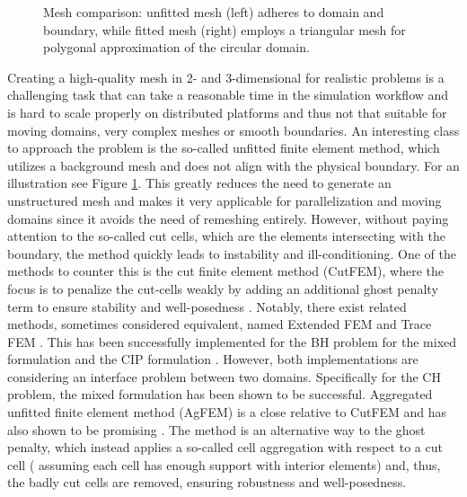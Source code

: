 \begin{figure}[h!]
\begin{minipage}{0.45\textwidth}
    \end{minipage}
\caption{Mesh comparison: unfitted mesh (left) adheres to domain and boundary, while fitted mesh (right) employs a triangular mesh for polygonal approximation of the circular domain.}
\label{fig:domain_mesh}
\end{figure}

Creating a high-quality mesh in 2- and 3-dimensional for realistic problems is a challenging task that can take a reasonable time in the simulation workflow and is hard to scale properly on distributed platforms and thus not that suitable for moving
domains, very complex meshes or smooth boundaries. An interesting class to approach the problem is the so-called unfitted finite element method, which utilizes a background mesh and does not align with the physical boundary. For an illustration
see Figure \ref{fig:domain_mesh}.
This greatly reduces the need to generate an unstructured mesh and makes it very applicable for parallelization and moving domains
since it avoids the need of remeshing entirely. However, without paying attention to the so-called cut cells, which are the elements intersecting with the boundary, the method quickly leads to instability and ill-conditioning.
One of the methods to counter this is the cut finite element method (CutFEM), where the focus is to penalize the cut-cells weakly by adding an additional ghost penalty term to ensure stability and well-posedness \cite{burman2015cutfem}. Notably, there exist related methods, sometimes considered equivalent, named Extended FEM and Trace FEM \cite{cai2021nitsche,zonca2018unfitted}.
This has been successfully implemented for the BH problem for the
mixed formulation \cite{cai2023nitsche} and the CIP formulation \cite{chen2023arbitrary, cai2021nitsche}. However,  both implementations are considering an interface problem between two domains. Specifically for the CH problem, the mixed formulation \cite{karatzas2021reduced} has been shown to be successful.
 Aggregated unfitted finite element method (AgFEM) is a close relative to CutFEM and has also shown to
be promising \cite{badia2018aggregated, badia2022linking}. The method is an alternative way to the ghost penalty, which instead applies a so-called cell aggregation with respect to a cut cell ( assuming each cell has enough support with interior elements) and,
thus, the badly cut cells are removed, ensuring robustness and well-posedness.




